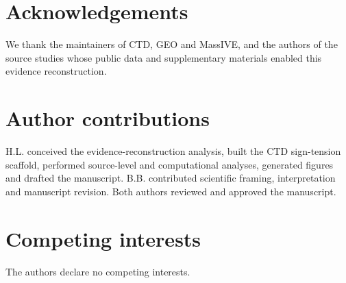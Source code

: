 \documentclass[11pt]{article}
\begin{document}
\section{Acknowledgements}
We thank the maintainers of CTD, GEO and MassIVE, and the authors of the source studies whose public data and supplementary materials enabled this evidence reconstruction.

\section{Author contributions}
H.L. conceived the evidence-reconstruction analysis, built the CTD sign-tension scaffold, performed source-level and computational analyses, generated figures and drafted the manuscript. B.B. contributed scientific framing, interpretation and manuscript revision. Both authors reviewed and approved the manuscript.

\section{Competing interests}
The authors declare no competing interests.
\end{document}
